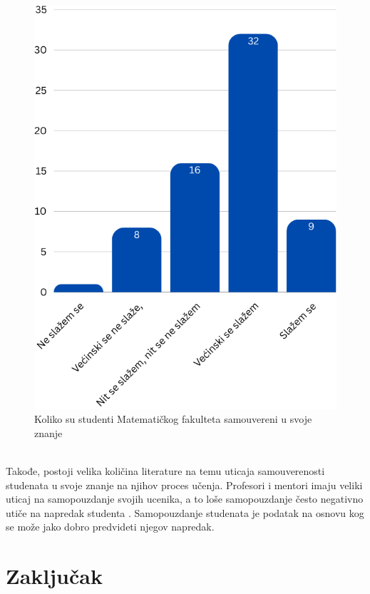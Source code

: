 \documentclass[a4paper]{article}
\begin{document}
\begin{figure}[h!]
\begin{center}
    \includegraphics[scale = 0.3]{SamouverenostStudenataMatf.png}
    \caption{Koliko su studenti Matematičkog fakulteta samouvereni u svoje znanje}
    \label{fig:samouverenost_matf}
\end{center}
\end{figure}
\\
Takođe, postoji velika količina literature na temu uticaja samouverenosti studenata u svoje znanje na njihov proces učenja. Profesori i mentori imaju veliki uticaj na samopouzdanje svojih ucenika, a to loše samopouzdanje često negativno utiče na napredak studenta \cite{G1}. 
Samopouzdanje studenata je podatak na osnovu kog se može jako dobro predvideti njegov napredak.\cite{G2}




\section{Zaključak}
\label{sec:zakljucak}
\end{document}
